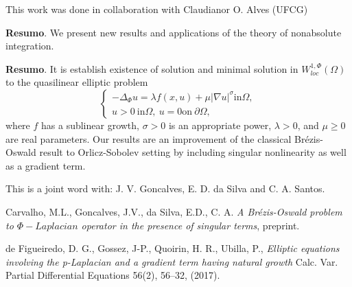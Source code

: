 	\vspace*{0.5cm} \noindent This work was done in collaboration with Claudianor O. Alves (UFCG)
	
	\vspace{24pt}
	
	
	
	\noindent\textbf{Resumo}.\label{mcabf} 
	We present new results and applications of the theory of nonabsolute integration.
	
	\vspace{24pt}
	
	
	
	\noindent\textbf{Resumo}.\label{mlmc} 
	It is establish existence of solution and minimal solution in $W^{1,\Phi}_{loc}(\Omega)$ to the quasilinear elliptic problem
	$$
	\left\{
	\begin{array}{l}
	\displaystyle-\Delta_\Phi u= \lambda f(x,u)+\mu\vert \nabla u \vert^{\sigma}\mbox{in}\Omega,\\
	u>0~\mbox{in}\Omega,~u=0\mbox{on}~\partial \Omega,
	\end{array}
	\right.
	$$
	where $f$ has a sublinear growth, $\sigma>0$ is an appropriate power, $\lambda>0$, and $\mu \geq 0$ are real parameters. Our results are an improvement of the classical Br\'ezis-Oswald result to Orlicz-Sobolev setting by including singular nonlinearity as well as a gradient term.
	
	
	
	\vspace*{0.5cm} \noindent This is a joint word with: J. V. Goncalves, E. D. da Silva and C. A. Santos.
	
	
	\begin{thebibliography}{999}
	 Carvalho, M.L., Goncalves, J.V., da Silva, E.D., C. A. {\it A Br\'ezis-Oswald problem to $\Phi\!-\!Laplacian$ operator in the presence of singular terms}, preprint.
	
	 de Figueiredo, D. G., Gossez,  J-P., Quoirin, H. R., Ubilla, P., {\it Elliptic equations involving the p-Laplacian and a gradient term having natural growth}  Calc. Var. Partial Differential Equations 56(2), 56--32, (2017). 
	\end{thebibliography}
	
